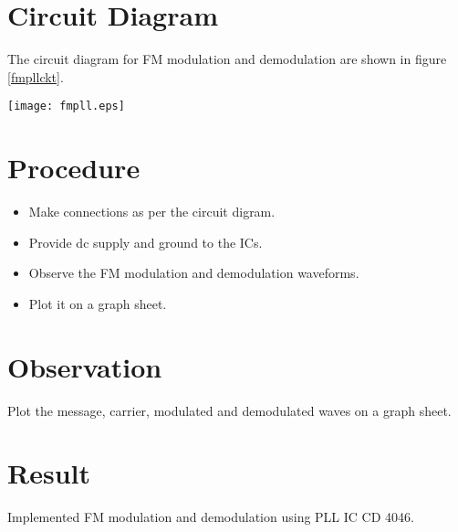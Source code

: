 \section*{Circuit Diagram}

The circuit diagram for FM modulation and demodulation are shown in figure \ref{fmpllckt}.

\begin{sidewaysfigure}[ht]
    \texttt{[image: fmpll.eps]}
    \caption{Circuit for FM generation and detection using CD4046 PLL IC}
    \label{fmpllckt}
\end{sidewaysfigure}


\section*{Procedure}
\begin{itemize}
\item
Make connections as per the circuit digram.

\item
Provide dc supply and ground to the ICs.

\item
Observe the FM modulation and demodulation waveforms.

\item
Plot it on a graph sheet.
\end{itemize}
\section*{Observation}

Plot the message, carrier, modulated and demodulated waves on a graph sheet.
\section*{Result}
Implemented FM modulation and demodulation using PLL IC CD 4046.